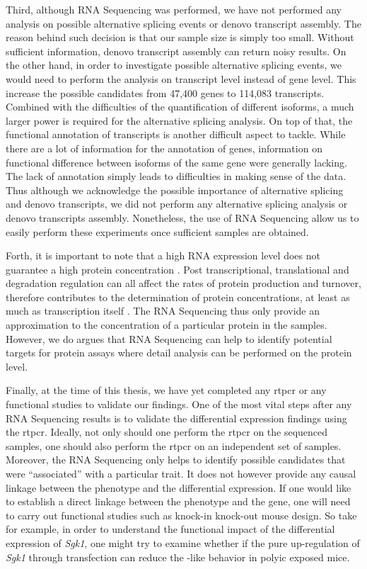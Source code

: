 Third, although RNA Sequencing was performed, we have not performed any analysis on possible alternative splicing events or denovo transcript assembly.
The reason behind such decision is that our sample size is simply too small.
Without sufficient information, denovo transcript assembly can return noisy results.
On the other hand, in order to investigate possible alternative splicing events, we would need to perform the analysis on transcript level instead of gene level. 
This increase the possible candidates from 47,400 genes to 114,083 transcripts.
Combined with the difficulties of the quantification of different isoforms, a much larger power is required for the alternative splicing analysis. 
On top of that, the functional annotation of transcripts is another difficult aspect to tackle.
While there are a lot of information for the annotation of genes, information on functional difference between isoforms of the same gene were generally lacking. 
The lack of annotation simply leads to difficulties in making sense of the data. 
Thus although we acknowledge the possible importance of alternative splicing and denovo transcripts, we did not perform any alternative splicing analysis or denovo transcripts assembly.
Nonetheless, the use of RNA Sequencing allow us to easily perform these experiments once sufficient samples are obtained.

Forth, it is important to note that a high RNA expression level does not guarantee a high protein concentration \citep{Vogel2012}.
Post transcriptional, translational and degradation regulation can all affect the rates of protein production and turnover, therefore contributes to the determination of protein concentrations, at least as much as transcription itself \citep{Vogel2012}.
The RNA Sequencing thus only provide an approximation to the concentration of a particular protein in the samples.
However, we do argues that RNA Sequencing can help to identify potential targets for protein assays where detail analysis can be performed on the protein level.

Finally, at the time of this thesis, we have yet completed any \gls{rtpcr} or any functional studies to validate our findings.
One of the most vital steps after any RNA Sequencing results is to validate the differential expression findings using the \gls{rtpcr}.
Ideally, not only should one perform the \gls{rtpcr} on the sequenced samples, one should also perform the \gls{rtpcr} on an independent set of samples. 
Moreover, the RNA Sequencing only helps to identify possible candidates that were ``associated'' with a particular trait.
It does not however provide any causal linkage between the phenotype and the differential expression.
If one would like to establish a direct linkage between the phenotype and the gene, one will need to carry out functional studies such as knock-in knock-out mouse design.
So take for example, in order to understand the functional impact of the differential expression of \textit{Sgk1}, one might try to examine whether if the pure up-regulation of \textit{Sgk1} through transfection can reduce the -like behavior in \gls{polyic} exposed mice.

